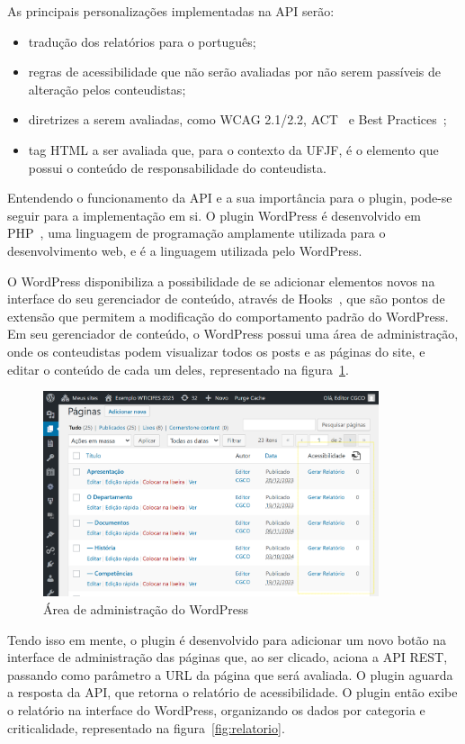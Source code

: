 \documentclass[
    12pt,
    a4paper,
    oneside,
    brazil,
    english
]{article}
\begin{document}
As principais personalizações implementadas na API serão:
\begin{itemize}
  \item tradução dos relatórios para o português;
  \item regras de acessibilidade que
        não serão avaliadas por não serem passíveis de alteração pelos conteudistas;
  \item diretrizes a serem avaliadas, como WCAG 2.1/2.2, ACT~\cite{ACT} e Best
        Practices~\cite{BP};
  \item tag HTML a ser avaliada que, para o contexto da UFJF, é o elemento que possui o conteúdo de responsabilidade do conteudista.
\end{itemize}

Entendendo o funcionamento da API e a sua importância para o
plugin, pode-se seguir para a implementação em si. O plugin WordPress
é desenvolvido em PHP~\cite{php}, uma linguagem de programação amplamente utilizada
para o desenvolvimento web, e é a linguagem utilizada pelo WordPress.

O WordPress disponibiliza a possibilidade de se adicionar elementos novos na interface
do seu gerenciador de conteúdo, através de Hooks~\cite{hooks}, que são pontos
de extensão que permitem a modificação do comportamento padrão do WordPress. Em seu
gerenciador de conteúdo, o WordPress possui uma área de administração, onde
os conteudistas podem visualizar todos os posts e as páginas do site, e editar o conteúdo
de cada um deles, representado na figura~\ref{fig:wp-admin}.
\begin{figure}[ht]
  \centering
  \caption{Área de administração do WordPress}
  \label{fig:wp-admin}
  \includegraphics[width=0.88\textwidth]{imagem1.png}
\end{figure}

Tendo isso em mente, o plugin é desenvolvido para adicionar um novo botão na
interface de administração das páginas que, ao ser clicado, aciona a API REST,
passando como parâmetro a URL da página que será avaliada. O plugin aguarda a resposta da API,
que retorna o relatório de acessibilidade. O plugin
então exibe o relatório na interface do WordPress, organizando os dados
por categoria e criticalidade, representado na figura~\ref{fig:relatorio}.
\end{document}

